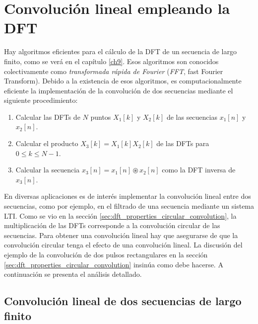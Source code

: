 \documentclass[a4paper]{report}
\begin{document}
\section{Convolución lineal empleando la DFT}\label{sec:dft_linear_convolution_with_dft}

Hay algoritmos eficientes para el cálculo de la DFT de un secuencia de largo finito, como se verá en el capítulo \ref{ch9}. Esos algoritmos son conocidos colectivamente como \emph{transformada rápida de Fourier} (\emph{FFT}, fast Fourier Transform). Debido a la existencia de esos algoritmos, es computacionalmente eficiente la implementación de la convolución de dos secuencias mediante el siguiente procedimiento:
\begin{enumerate}[label=(\alph*)]
 \item Calcular las DFTs de \(N\) puntos \(X_1[k]\) y \(X_2[k]\) de las secuencias \(x_1[n]\) y \(x_2[n]\).
 \item Calcular el producto \(X_3[k]=X_1[k]X_2[k]\) de las DFTs para \(0\leq k\leq N-1\).
 \item Calcular la secuencia \(x_3[n]=x_1[n]\circledast x_2[n]\) como la DFT inversa de \(x_3[n]\).
\end{enumerate}
En diversas aplicaciones es de interés implementar la convolución lineal entre dos secuencias, como por ejemplo, en el filtrado de una secuencia mediante un sistema LTI. Como se vio en la sección \ref{sec:dft_properties_circular_convolution}, la multiplicación de las DFTs corresponde a la convolución circular de las secuencias. Para obtener una convolución lineal hay que asegurarse de que la convolución circular tenga el efecto de una convolución lineal. La discusión del ejemplo de la convolución de dos pulsos rectangulares en la sección \ref{sec:dft_properties_circular_convolution} insinúa como debe hacerse. A continuación se presenta el análisis detallado.

\subsection{Convolución lineal de dos secuencias de largo finito}\label{sec:dft_linear_convolution}
\end{document}
